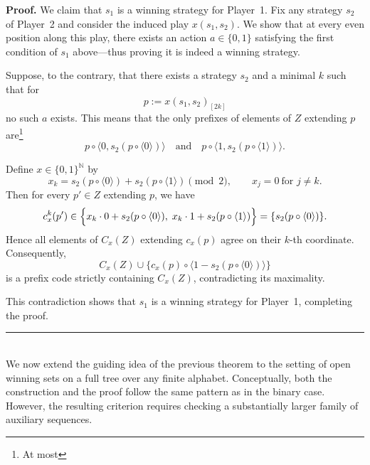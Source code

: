 \documentclass[a4,12pt]{article}%
\newenvironment{proof}[1][Proof]{\textbf{#1.} }{\ \rule{0.5em}{0.5em}}
\begin{document}
\begin{proof}
We claim that $s_1$ is a winning strategy for Player~1.
Fix any strategy $s_2$ of Player~2 and consider the induced play
$x(s_1,s_2)$. We show that at every even position along this play, there
exists an action $a \in \{0,1\}$ satisfying the first condition of
$s_1$ above---thus proving it is indeed a winning strategy.

Suppose, to the contrary, that there exists a strategy $s_2$ and
a minimal $k$ such that for
\[
p := x(s_1,s_2)_{[2k]}
\]
no such $a$ exists. This means that the only prefixes of elements of $Z$
extending $p$ are\footnote{At most}
\[
p \circ \langle 0, s_2(p \circ \langle 0\rangle)\rangle
\quad \text{and} \quad
p \circ \langle 1, s_2(p \circ \langle 1\rangle)\rangle.
\]

Define $x \in \{0,1\}^{\mathbb{N}}$ by
\[
x_k = s_2(p \circ \langle 0\rangle) + s_2(p \circ \langle 1\rangle) \pmod{2},
\qquad
x_j = 0 \ \text{for } j \neq k.
\]
Then for every $p' \in Z$ extending $p$, we have
\[
c_x^k(p') \in
\Bigl\{
x_k \cdot 0 + s_2(p \circ \langle 0\rangle),
\;
x_k \cdot 1 + s_2(p \circ \langle 1\rangle)
\Bigr\}
=
\{ s_2(p \circ \langle 0\rangle) \}.
\]
Hence all elements of $C_x(Z)$ extending $c_x(p)$ agree on their
$k$-th coordinate. Consequently,
\[
C_x(Z) \cup \{ c_x(p) \circ \langle 1 - s_2(p \circ \langle 0\rangle) \rangle \}
\]
is a prefix code strictly containing $C_x(Z)$, contradicting its
maximality.

This contradiction shows that $s_1$ is a winning strategy for Player~1,
completing the proof.
\end{proof}
\\

We now extend the guiding idea of the previous theorem to the setting of
open winning sets on a full tree over any finite alphabet.
Conceptually, both the construction and the proof follow the same pattern
as in the binary case. However, the resulting criterion requires checking a substantially larger family of
auxiliary sequences.
\end{document}
